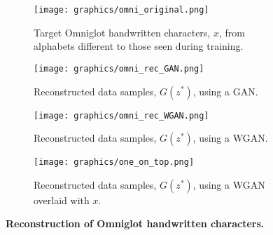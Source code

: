 \documentclass[journal]{IEEEtran}
\begin{document}
\begin{figure}[h]
\centering
    \begin{subfigure}{\columnwidth}
    \centering
        \texttt{[image: graphics/omni\_original.png]}
        \caption{ Target Omniglot handwritten characters, $x$, from alphabets different to those seen during training.}
    \end{subfigure}
    \begin{subfigure}{\columnwidth}
        \texttt{[image: graphics/omni\_rec\_GAN.png]} %
        \caption{Reconstructed data samples, $G(z^*)$, using a GAN.}
    \end{subfigure}
    \begin{subfigure}{\columnwidth}
        \texttt{[image: graphics/omni\_rec\_WGAN.png]} %
        \caption{Reconstructed data samples, $G(z^*)$, using a WGAN.}
    \end{subfigure}
    \begin{subfigure}{\columnwidth}
        \texttt{[image: graphics/one\_on\_top.png]}
        \caption{Reconstructed data samples, $G(z^*)$, using a WGAN overlaid with $x$.}
    \end{subfigure}
    \caption{\textbf{Reconstruction of Omniglot handwritten characters.}}
    \label{fig:omni_rec}
\end{figure}
\end{document}
